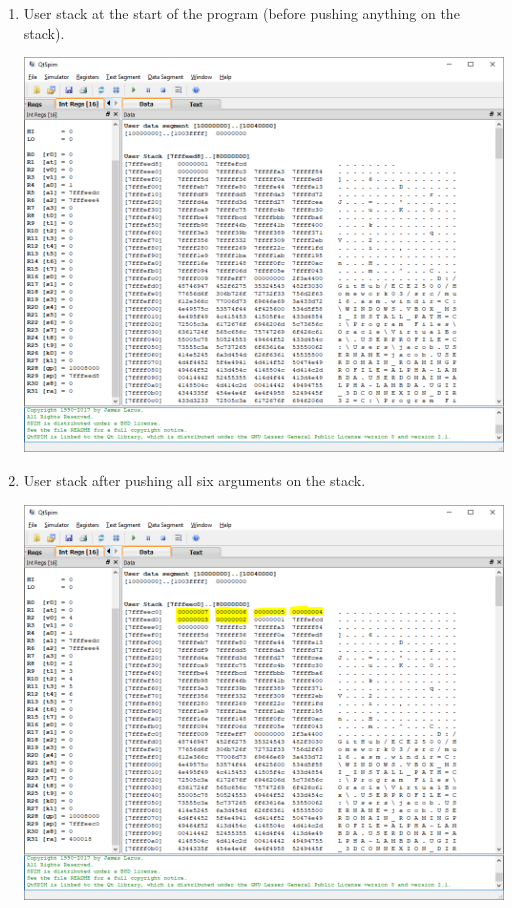 \documentclass[12pt,letterpaper,titlepage]{article}
\begin{document}
\begin{raggedright}
\begin{enumerate}
\item User stack at the start of the program (before pushing anything on the stack).
\begin{center}
\includegraphics[width=\textwidth, height=20\baselineskip, keepaspectratio=true]{pre}
\end{center}

\item User stack after pushing all six arguments on the stack.
\begin{center}
\includegraphics[width=\textwidth, height=20\baselineskip, keepaspectratio=true]{post}
\end{center}

\end{enumerate}

\end{raggedright}
\end{document}
